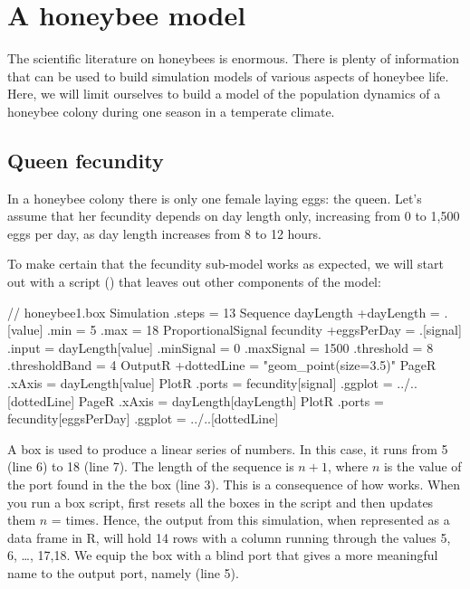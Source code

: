 \FloatBarrier
\section{A honeybee model}
The scientific literature on honeybees is enormous. There is plenty of information that can be used to build simulation models of various aspects of honeybee life. Here, we will limit ourselves to build a model of the population dynamics of a honeybee colony during one season in a temperate climate.

\subsection{Queen fecundity}
In a honeybee colony there is only one female laying eggs: the queen. Let's assume that her fecundity depends on day length only, increasing from 0 to 1,500 eggs per day, as day length increases from 8 to 12 hours.

To make certain that the fecundity sub-model works as expected, we will start out with a  script () that leaves out other components of the model:

\lstset{numbers=left}
\begin{boxscript}
// honeybee1.box
Simulation {
  .steps = 13
  Sequence dayLength {
    +dayLength = .[value]
    .min = 5
    .max = 18
  }
  ProportionalSignal fecundity {
    +eggsPerDay = .[signal]
    .input = dayLength[value]
    .minSignal = 0
    .maxSignal = 1500
    .threshold = 8
    .thresholdBand = 4
  }
  OutputR {
    +dottedLine = "geom_point(size=3.5)"
    PageR {
      .xAxis = dayLength[value]
      PlotR {
        .ports = fecundity[signal]
        .ggplot = ../..[dottedLine]
      }
    }
    PageR {
      .xAxis = dayLength[dayLength]
      PlotR {
        .ports = fecundity[eggsPerDay]
        .ggplot = ../..[dottedLine]
      }
    }
  }
}
\end{boxscript}
\lstset{numbers=none}

A  box is used to produce a linear series of numbers. In this case, it runs from 5 (line 6) to 18 (line 7). The length of the sequence is $n+1$, where $n$ is the value of the  port found in the the  box (line 3). This is a consequence of how  works. When you run a box script,  first resets all the boxes in the script and then updates them $n$ =  times. Hence, the output from this simulation, when represented as a data frame in R, will hold 14 rows with a  column running through the values 5, 6, \ldots, 17,18. We equip the box with a blind port that gives a more meaningful name to the  output port, namely  (line 5).

